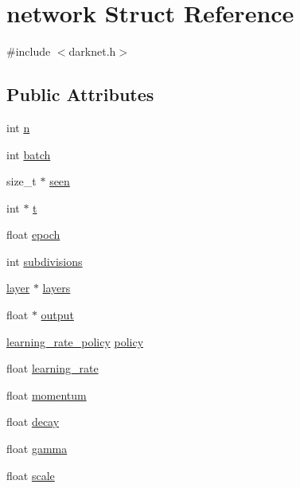 \hypertarget{structnetwork}{}\section{network Struct Reference}
\label{structnetwork}


{\ttfamily \#include $<$darknet.\+h$>$}

\subsection*{Public Attributes}
\begin{DoxyCompactItemize}
\item 
int \mbox{\hyperlink{structnetwork_a1c7625720955322d05924a075d013877}{n}}
\item 
int \mbox{\hyperlink{structnetwork_a04f448f3f8c3f1314e2b23b429bec827}{batch}}
\item 
size\+\_\+t $\ast$ \mbox{\hyperlink{structnetwork_aaa4dc3920fc905e52573172d45fccd45}{seen}}
\item 
int $\ast$ \mbox{\hyperlink{structnetwork_a185b52d74237f3cd32d2d0186d2d2f5b}{t}}
\item 
float \mbox{\hyperlink{structnetwork_a7b16b097d1814258e82b58d663692875}{epoch}}
\item 
int \mbox{\hyperlink{structnetwork_ab30643da07e0f787ee0cd2058cd41a6e}{subdivisions}}
\item 
\mbox{\hyperlink{structlayer}{layer}} $\ast$ \mbox{\hyperlink{structnetwork_a9770423f88b722bafc9d1fd3c6091d75}{layers}}
\item 
float $\ast$ \mbox{\hyperlink{structnetwork_a274dce0db2d5175992eb3b273ab09df7}{output}}
\item 
\mbox{\hyperlink{darknet_8h_a9c2ce38711c59085616b738d2aa21184}{learning\+\_\+rate\+\_\+policy}} \mbox{\hyperlink{structnetwork_a78121635a0f0c3a1d9991390b4325dc3}{policy}}
\item 
float \mbox{\hyperlink{structnetwork_a978d3e339536cd6bea2270d49d93c35a}{learning\+\_\+rate}}
\item 
float \mbox{\hyperlink{structnetwork_a495c60ef821ca0ade1c42907c8bc90bf}{momentum}}
\item 
float \mbox{\hyperlink{structnetwork_a9afd53b100d35dc162e48118ef4f7eea}{decay}}
\item 
float \mbox{\hyperlink{structnetwork_a5460d67e44c0877ca016ed12925788fe}{gamma}}
\item 
float \mbox{\hyperlink{structnetwork_a0d9e7af8dde42e28a7fdb0e685b2f23b}{scale}}
\item 

\end{DoxyCompactItemize}

